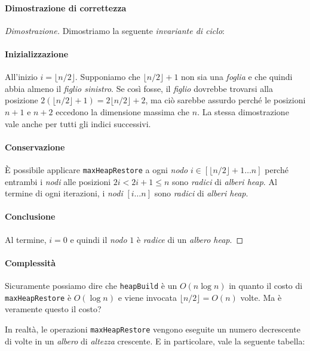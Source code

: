 \paragraph{Dimostrazione di correttezza}
\begin{proof}[Dimostrazione]
    Dimostriamo la seguente \emph{invariante di ciclo}:
    
    \smallskip{}
    \paragraph{Inizializzazione}
    All'inizio $i=\lfloor n/2\rfloor$. Supponiamo che $\lfloor n/2\rfloor+1$ non
    sia una \emph{foglia} e che quindi abbia almeno il \emph{figlio sinistro}.
    Se così fosse, il \emph{figlio} dovrebbe trovarsi alla posizione $2(\lfloor
    n/2\rfloor+1)=2\lfloor n/2\rfloor+2$, ma ciò sarebbe assurdo perché le posizioni
    $n+1$ e $n+2$ eccedono la dimensione massima che $n$. La stessa dimostrazione
    vale anche per tutti gli indici successivi.
    \paragraph{Conservazione}
    È possibile applicare \texttt{maxHeapRestore} a ogni \emph{nodo} $i\in[\lfloor
    n/2\rfloor+1\dots n]$ perché entrambi i \emph{nodi} alle posizioni $2i<2i+1\leq
    n$ sono \emph{radici} di \emph{alberi heap}. Al termine di ogni iterazioni,
    i \emph{nodi} $[i\dots n]$ sono \emph{radici} di \emph{alberi heap}.
    \paragraph{Conclusione} Al termine, $i=0$ e quindi il \emph{nodo} $1$ è
    \emph{radice} di un \emph{albero heap}.
\end{proof}
\paragraph{Complessità}
Sicuramente possiamo dire che \texttt{heapBuild} è un $O(n\log n)$ in quanto il costo
di \texttt{maxHeapRestore} è $O(\log n)$ e viene invocata $\lfloor n/2\rfloor=O(n)$
volte. Ma è veramente questo il costo?

\bigskip\noindent
In realtà, le operazioni \texttt{maxHeapRestore} vengono eseguite un
numero decrescente di volte in un \emph{albero} di \emph{altezza} crescente. E in
particolare, vale la seguente tabella:

